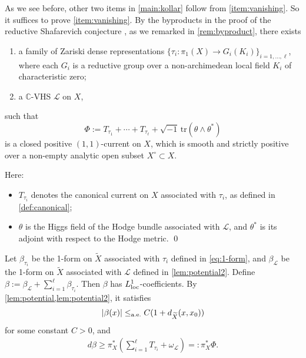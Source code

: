 \documentclass[english]{amsproc}
\theoremstyle{plain}
\theoremstyle{definition}
\theoremstyle{remark}
\theoremstyle{plain}
\numberwithin{equation}{thm} %
\newcommand{\cL}{\mathcal L}
\newcommand{\bC}{\mathbb{C}}
\begin{document}
		As we see before, other two items in \cref{main:kollar} follow from \cref{item:vanishing}.  So it suffices to prove \cref{item:vanishing}.   
		By the byproducts in the proof of the  reductive Shafarevich conjecture  \cite{Eys04,DY23}, as we remarked in \cref{rem:byproduct}, there exists 
		\begin{enumerate}
			\item a family of Zariski dense representations \( \{\tau_i: \pi_1(X) \to G_i(K_i)\}_{i=1,\ldots,\ell} \), where each \( G_i \) is a reductive group over a non-archimedean local field \( K_i \) of characteristic zero;
			\item a \( \bC \)-VHS \( \cL \) on \( X \),
		\end{enumerate}
		such that
		\[
		\Phi:=T_{\tau_1} + \cdots + T_{\tau_\ell} + \sqrt{-1} \, \mathrm{tr}(\theta \wedge \theta^*)
		\]
		is a closed positive \( (1,1) \)-current on \( X \), which is smooth and strictly positive over a non-empty analytic open subset \( X^\circ \subset X \).
		
		Here:
		\begin{itemize}
			\item \( T_{\tau_i} \) denotes the canonical current on \( X \) associated with \( \tau_i \), as defined in \cref{def:canonical};
			\item \( \theta \) is the Higgs field of the Hodge bundle associated with \( \cL \), and \( \theta^* \) is its adjoint with respect to the Hodge metric. \qed
		\end{itemize}
		Let $\beta_{\tau_i}$ be the   1-form on $\widetilde{X}$ associated with $\tau_i$   defined in \eqref{eq:1-form}, and $\beta_\cL$ be the    1-form on $\widetilde{X}$ associated with $\cL$   defined in \eqref{lem:potential2}. 
		Define 
		$\beta:=\beta_\cL+\sum_{i=1}^{\ell}\beta_{\tau_i}$.  Then $\beta$ has $L_{\rm loc}^1$-coefficients. By \cref{lem:potential,lem:potential2}, it satisfies 
		\begin{align}\label{eq:dsub}
			|\beta(x)|\leq_{\rm a.e.} C(1+d_{\widetilde{X}}(x, x_0)) 
		\end{align} 
		for some constant $C>0$, and 
		\begin{align}\label{eq:mutual}
			d\beta\geq   \pi_X^*(\sum_{i=1}^{\ell}T_{\tau_i}+\omega_{\cL} )=:\pi_X^*\Phi.
		\end{align}   
		
\end{document}
